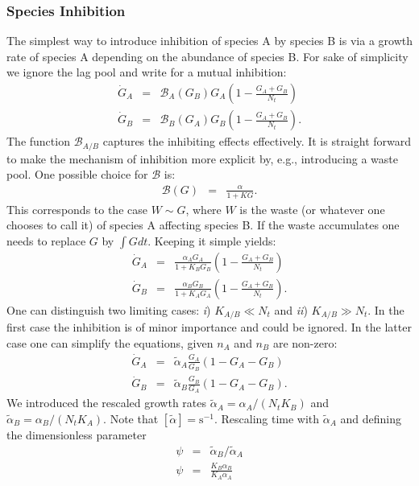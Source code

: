 \documentclass[10pt,A4paper]{article}
\begin{document}
\subsubsection{Species Inhibition}
The simplest way to introduce inhibition of species A by species B is via a growth rate of species A depending on the abundance of species B. 
For sake of simplicity we ignore the lag pool and write for a mutual inhibition:
\begin{eqnarray}
    \dot{G}_A &=& \mathcal{B}_A(G_B)G_A\left(1 - \frac{G_A+G_B}{N_t}\right)\\
    \dot{G}_B &=& \mathcal{B}_B(G_A) G_B\left(1-\frac{G_A+G_B}{N_t}\right). 
\end{eqnarray}
The function $\mathcal{B}_{A/B}$ captures the inhibiting effects effectively. 
It is straight forward to make the mechanism of inhibition more explicit by, e.g., introducing a waste pool. 
One possible choice for $\mathcal{B}$ is: 
\begin{eqnarray}
    \mathcal{B}(G)&=&\frac{\alpha}{1+KG}. 
\end{eqnarray}
This corresponds to the case $W\sim G$, where $W$ is the waste (or whatever one chooses to call it) of species A affecting species B. 
If the waste accumulates one needs to replace $G$ by $\int G dt$. Keeping it simple yields:
\begin{eqnarray}
    \dot{G}_A &=& \frac{\alpha_A G_A}{1+K_BG_B}\left(1 - \frac{G_A+G_B}{N_t}\right)\\
    \dot{G}_B &=& \frac{\alpha_B G_B}{1+K_AG_A}\left(1-\frac{G_A+G_B}{N_t}\right). 
\end{eqnarray}
One can distinguish two limiting cases: {\it i}) $K_{A/B}\ll N_t$ and {\it ii}) $K_{A/B}\gg N_t$. 
In the first case the inhibition is of minor importance and could be ignored. 
In the latter case one can simplify the equations, given $n_A$ and $n_B$ are non-zero:
\begin{eqnarray}
\label{Mut_Inhib}
    \dot{G}_A &=&\tilde{\alpha}_A\frac{G_A}{G_B}\left(1 - G_A-G_B\right)\\
    \dot{G}_B &=& \tilde{\alpha}_B\frac{G_B}{G_A}\left(1-G_A-G_B\right). 
\end{eqnarray}
We introduced the rescaled growth rates $\tilde{\alpha}_A=\alpha_A/(N_tK_B)$ and $\tilde{\alpha}_B=\alpha_B/(N_tK_A)$. Note that $[\tilde{\alpha}]=\mathrm{s}^{-1}$.
Rescaling time with $\tilde{\alpha}_A$ and defining the dimensionless parameter 
\begin{eqnarray}
    \psi&=&\tilde{\alpha}_B/\tilde{\alpha}_A\\
    \psi&=&\frac{K_B\alpha_B}{K_A\alpha_A}
\end{eqnarray}
\end{document}
